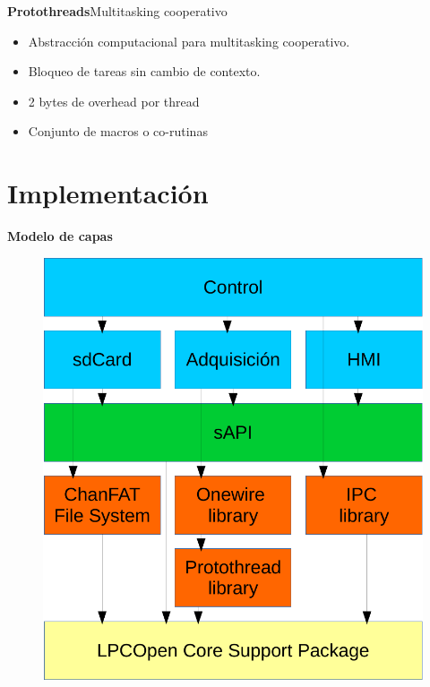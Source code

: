 \documentclass[11pt]{beamer}
\begin{document}
\begin{frame}{\textbf{\LARGE{Protothreads}}}{Multitasking cooperativo}
	\vspace{-.7cm}
	\fontsize{18pt}{18}\selectfont
	\vspace{-.7cm}
	\centering
	\begin{itemize}
		\item Abstracción computacional para multitasking cooperativo.
		\vspace{15px}
		\item Bloqueo de tareas sin cambio de contexto.
		\vspace{15px}
		\item 2 bytes de overhead por thread
		\vspace{15px}	
		\item Conjunto de macros o co-rutinas
	\end{itemize}
\end{frame}
\section{Implementación}

\begin{frame}{\textbf{\LARGE{Modelo de capas}}}
	\vspace{-.7cm}
	\begin{figure}[H]
		\includegraphics[height=.8\textheight]{./imagenes/capas.pdf}
	\end{figure}	
\end{frame}
\end{document}
